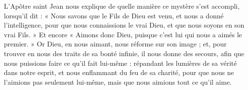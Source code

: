 L’Apôtre saint Jean nous explique de quelle manière ce mystère s’est accompli, lorsqu’il dit : « Nous savons que le Fils de Dieu est venu, et nous a donné l’intelligence, pour que nous connaissions le vrai Dieu, et que nous soyons en son vrai Fils. » Et encore « Aimons donc Dieu, puisque c’est lui qui nous a aimés le premier. » Or Dieu, en nous aimant, nous réforme sur son image ; et, pour trouver en nous des traits de sa bonté infinie, il nous donne des secours, afin que nous puissions faire ce qu’il fait lui-même : répandant les lumières de sa vérité dans notre esprit, et nous enflammant du feu de sa charité, pour que nous ne l’aimions pas seulement lui-même, mais que nous aimions tout ce qu’il aime.